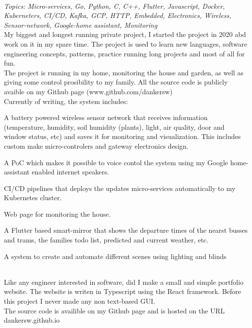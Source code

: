  \\
\emph{Topics: Micro-services, Go, Python, C, C++, Flutter, Javascript, Docker, Kuberneters, CI/CD, Kafka, GCP, HTTP, Embedded, Electronics, Wireless, Sensor-network, Google-home assistant, Monitoring} \\
\SmallSep
My biggest and longest running private project, I started the project in 2020 abd work on it in my spare time. The project is used to learn new languages, software engineering concepts, patterns, practice running long projects and most of all for fun. \\
\VerySmallSep
The project is running in my home, monitoring the house and garden, as well as giving some control prosibility to my family. All the source code is publicly avaible on my Github page (www.github.com/dankersw) \\
\VerySmallSep
Currently of writing, the system includes:
\begin{compactitem}[\color{RoyalBlue}$\circ$]
    \item A battery powered wireless sensor network that receives information (temperature, humidity, soil humidity (plants), light, air quality, door and window status, etc) and saves it for monitoring and visualization. This includes custom make micro-controlers and gateway electronics design.
    \item A PoC which makes it possible to voice contol the system using my Google home-assistant enabled internet speakers.
    \item CI/CD pipelines that deploys the updates micro-services automatically to my Kubernetes cluster.
    \item Web page for monitoring the house.
    \item A Flutter based smart-mirror that shows the departure times of the nearst busses and trams, the families todo list, predicted and current weather, etc.
    \item A system to create and automate different scenes using lighting and blinds
\end{compactitem}
\Sep

 \\
Like any engineer interested in software, did I make a small and simple portfolio website. The website is writen in Typescript using the React framework. Before this project I never made any non text-based GUI.\\
The source code is availible on my Github page and is hosted on the URL dankersw.github.io
\Sep

